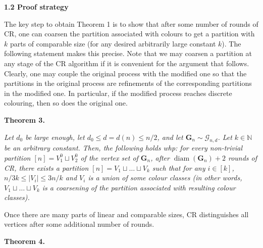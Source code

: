 \par\medskip\noindent\textbf{
1.2 Proof strategy}\par




The key step to obtain Theorem 1 is to show that after some number of rounds of CR, one can coarsen the partition associated with colours to get a partition with $k$ parts of comparable size (for any desired arbitrarily large constant $k$). The following statement makes this precise.
Note that we may coarsen a partition at any stage of the CR algorithm if it is convenient for the argument that follows. Clearly, one may couple the original process with the modified one so that the partitions in the original process are refinements of the corresponding partitions in the modified one. In particular, if the modified process reaches discrete colouring, then so does the original one.\par





\par\medskip\noindent\textbf{
\textbf{Theorem 3}\textbf{.}
}\par



\emph{Let $d_{0}$ be large enough, let $d_{0}\leq d=d(n)\leq n/2$, and let $\mathbf{G}_{n}\sim\mathcal{G}_{n,d}$. Let $k\in\mathbb{N}$ be an arbitrary constant. Then, the following holds whp: for every non-trivial partition $[n]=V_{1}^{0}\sqcup V_{2}^{0}$ of the vertex set of $\mathbf{G}_{n}$, after $\operatorname{diam}(\mathbf{G}_{n})+2$ rounds of CR, there exists a partition $[n]=V_{1}\sqcup\ldots\sqcup V_{k}$ such that for any $i\in[k]$, $n/3k\leq|V_{i}|\leq 3n/k$ and $V_{i}$ is a union of some colour classes (in other words, $V_{1}\sqcup\ldots\sqcup V_{k}$ is a coarsening of the partition associated with resulting colour classes).}\par






Once there are many parts of linear and comparable sizes, CR distinguishes all vertices after some additional number of rounds.\par





\par\medskip\noindent\textbf{
\textbf{Theorem 4}\textbf{.}
}\par



